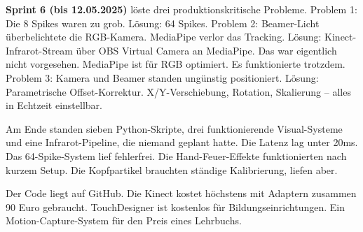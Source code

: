\textbf{Sprint 6 (bis 12.05.2025)} löste drei produktionskritische Probleme. Problem 1: Die 8 Spikes waren zu grob. Lösung: 64 Spikes. Problem 2: Beamer-Licht überbelichtete die RGB-Kamera. MediaPipe verlor das Tracking. Lösung: Kinect-Infrarot-Stream über OBS Virtual Camera an MediaPipe. Das war eigentlich nicht vorgesehen. MediaPipe ist für RGB optimiert. Es funktionierte trotzdem. Problem 3: Kamera und Beamer standen ungünstig positioniert. Lösung: Parametrische Offset-Korrektur. X/Y-Verschiebung, Rotation, Skalierung – alles in Echtzeit einstellbar.

Am Ende standen sieben Python-Skripte, drei funktionierende Visual-Systeme und eine Infrarot-Pipeline, die niemand geplant hatte. Die Latenz lag unter 20ms. Das 64-Spike-System lief fehlerfrei. Die Hand-Feuer-Effekte funktionierten nach kurzem Setup. Die Kopfpartikel brauchten ständige Kalibrierung, liefen aber.

Der Code liegt auf GitHub. Die Kinect kostet höchstens mit Adaptern zusammen 90 Euro gebraucht. TouchDesigner ist kostenlos für Bildungseinrichtungen. Ein Motion-Capture-System für den Preis eines Lehrbuchs.